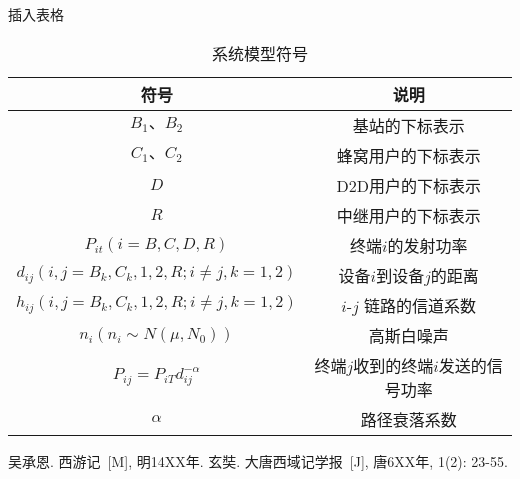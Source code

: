 \documentclass[UTF8,a4paper,12pt]{ctexart}
\newcommand{\wuhao}{\fontsize{10.5pt}{10.5pt}\selectfont}
\begin{document}
 
插入表格
\begin{table}[H] \wuhao             %
   \centering
  \caption{系统模型符号}\label{tab}
  \begin{tabular}{c|c}
    \toprule                  %
    符号 & 说明 \\
    \hline                  %
    ${{B_1}\mbox{、}{B_2}}$ & 基站的下标表示 \\
    ${C_1}\mbox{、}{C_2}$ & 蜂窝用户的下标表示 \\
    $D$ & D2D用户的下标表示 \\
    $R$ & 中继用户的下标表示 \\
    ${P_{it}}\left( {i = B,C,D,R} \right)$ & 终端$i$的发射功率 \\
    ${d_{ij}}(i,j = {B_k},{C_k},1,2,R;i \ne j,k = 1,2)$ & 设备$i$到设备$j$的距离 \\
    ${h_{ij}}(i,j = {B_k},{C_k},1,2,R;i \ne j,k = 1,2)$ &$i$-$j$ 链路的信道系数\\
    ${n_i}\left( {{n_i}\sim N\left( {\mu ,{N_0}} \right)} \right)$ & 高斯白噪声 \\
    ${P_{ij}} = {P_{iT}}d_{ij}^{ - \alpha }$ & 终端$j$收到的终端$i$发送的信号功率\\
    $\alpha$ & 路径衰落系数 \\
    \bottomrule                %
  \end{tabular}
\end{table}
 

\begin{thebibliography}{99}
	\setlength{\parskip}{0pt} %
	吴承恩. 西游记~[M], 明14XX年.
	 玄奘. 大唐西域记学报~[J], 唐6XX年, 1(2): 23-55.
\end{thebibliography}
\end{document}
